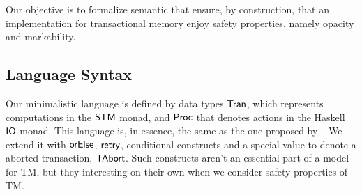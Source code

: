 \documentclass[sigplan, anonymous, review]{acmart}
\def\resethooks{%
  \global\let\SaveRestoreHook\empty
  \global\let\ColumnHook\empty}
\newlength{\blanklineskip}
\let\hspre\empty
\let\hspost\empty
\theoremstyle{definition}
\newcommand{\D}[1]{\blue{\mathsf{#1}}}
\newcommand{\C}[1]{\red{\mathsf{#1}}}
\newcommand{\F}[1]{\green{\mathsf{#1}}}
\begin{document}
Our objective is to formalize semantic that ensure, by construction, that an
implementation for transactional memory enjoy safety properties, namely opacity and markability. 

\subsection{Language Syntax}\label{sec:stm-syntax}

Our minimalistic language is defined by data types \ensuremath{\D{Tran}}, which
represents computations in the \ensuremath{\D{STM}} monad, and \ensuremath{\D{Proc}} that denotes
actions in the Haskell \ensuremath{\D{IO}} monad. This language is, in essence,
the same as the one proposed by~\cite{Hu08}. We extend it with
\ensuremath{\F{orElse}}, \ensuremath{\F{retry}}, conditional constructs and a special value to
denote a aborted transaction, \ensuremath{\C{TAbort}}. Such constructs aren't
an essential part of a model for TM, but they interesting
on their own when we consider safety properties of TM.

\resethooks
\end{document}
